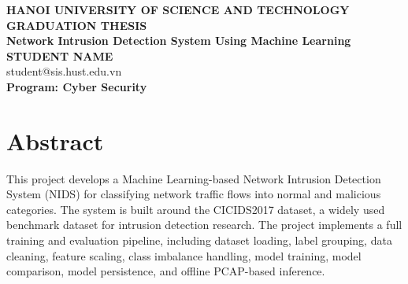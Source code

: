 \documentclass[12pt,a4paper]{article}
\begin{document}
\begin{titlepage}
    \begin{center}
        {\textbf{\large{HANOI UNIVERSITY OF SCIENCE AND TECHNOLOGY}}}\\[4cm]

        {\textbf{\huge{GRADUATION THESIS}}}\\[1cm]
        {\textbf{\Large{Network Intrusion Detection System Using Machine Learning}}}\\[1cm]

        {\textbf{\large{STUDENT NAME}}}\\
        {\large{student@sis.hust.edu.vn}}\\[0.5cm]

        {\textbf{\large{Program: Cyber Security}}}\\

        \vfill

    \end{center}
\end{titlepage}


\section*{Abstract}

This project develops a Machine Learning-based Network Intrusion Detection System (NIDS) for classifying network traffic flows into normal and malicious categories. The system is built around the CICIDS2017 dataset, a widely used benchmark dataset for intrusion detection research. The project implements a full training and evaluation pipeline, including dataset loading, label grouping, data cleaning, feature scaling, class imbalance handling, model training, model comparison, model persistence, and offline PCAP-based inference.
\end{document}

